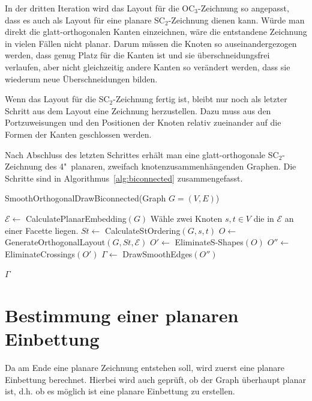 \documentclass[a4paper]{scrreprt}
\theoremstyle{definition}
\newcommand{\Epsilon}{\mathcal{E}}
\begin{document}
In der dritten Iteration wird das Layout für die OC$_3$-Zeichnung so angepasst, dass es auch als Layout für eine planare SC$_2$-Zeichnung dienen kann. Würde man direkt die glatt-orthogonalen Kanten einzeichnen, wäre die entstandene Zeichnung in vielen Fällen nicht planar. Darum müssen die Knoten so auseinandergezogen werden, dass genug Platz für die Kanten ist und sie überschneidungsfrei verlaufen, aber nicht gleichzeitig andere Kanten so verändert werden, dass sie wiederum neue Überschneidungen bilden.

Wenn das Layout für die SC$_2$-Zeichnung fertig ist, bleibt nur noch als letzter Schritt aus dem Layout eine Zeichnung herzustellen. Dazu muss aus den Portzuweisungen und den Positionen der Knoten relativ zueinander auf die Formen der Kanten geschlossen werden.

Nach Abschluss des letzten Schrittes erhält man eine glatt-orthogonale SC$_2$-Zeichnung des 4"~planaren, zweifach knotenzusammenhängenden Graphen. Die Schritte sind in Algorithmus~\ref{alg:biconnected} zusammengefasst.


\begin{algorithm}[ht]
  \caption{SmoothOrthogonalDrawBiconnected(Graph $G = (V,E)$)}
  \label{alg:biconnected}
  
  $\Epsilon \leftarrow$ CalculatePlanarEmbedding$(G)$ \;
  Wähle zwei Knoten $s, t \in V$ die in $\Epsilon$ an einer Facette liegen.\;
  $St \leftarrow$ CalculateStOrdering$(G, s, t)$ \;
  $O \leftarrow$ GenerateOrthogonalLayout$(G,St,\Epsilon)$ \;
  $O' \leftarrow$ EliminateS-Shapes$(O)$ \;
  $O'' \leftarrow$ EliminateCrossings$(O')$ \;
  $\Gamma \leftarrow$ DrawSmoothEdges$(O'')$ \;
  
  \Return $\Gamma$
\end{algorithm}


\section{Bestimmung einer planaren Einbettung}

Da am Ende eine planare Zeichnung entstehen soll, wird zuerst eine planare Einbettung berechnet. Hierbei wird auch geprüft, ob der Graph überhaupt planar ist, d.h. ob es möglich ist eine planare Einbettung zu erstellen. 
\end{document}
